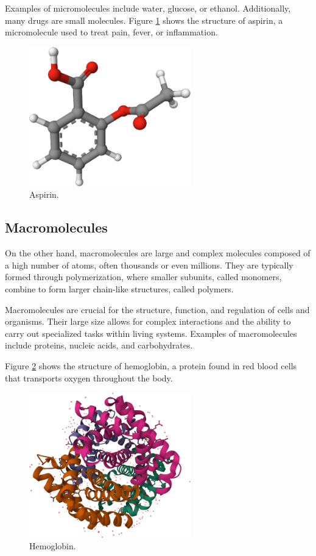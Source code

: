\documentclass[
  digital,     %
  oneside,     %
  nosansbold,  %
  nocolorbold, %
  lof,         %
  lot,         %
]{fithesis4}
\begin{document}
Examples of micromolecules include water, glucose, or ethanol. Additionally, many drugs are small molecules. Figure \ref{fig:aspirin} shows the structure of aspirin, a micromolecule used to treat pain, fever, or inflammation.

\begin{figure}[htbp]
  \begin{center}
    \includegraphics[width=7cm]{figures/aspirin.png}
  \end{center}
  \caption{Aspirin.}
  \label{fig:aspirin}
\end{figure}

\subsection{Macromolecules}


On the other hand, macromolecules are large and complex molecules composed of a high number of atoms, often thousands or even millions. They are typically formed through polymerization, where smaller subunits, called monomers, combine to form larger chain-like structures, called polymers.

Macromolecules are crucial for the structure, function, and regulation of cells and organisms. Their large size allows for complex interactions and the ability to carry out specialized tasks within living systems. Examples of macromolecules include proteins, nucleic acids, and carbohydrates.

Figure \ref{fig:hemoglobin} shows the structure of hemoglobin, a protein found in red blood cells that transports oxygen throughout the body.

\begin{figure}[htbp]
  \begin{center}
    \includegraphics[width=7cm]{figures/hemoglobin.png}
  \end{center}
  \caption{Hemoglobin.}
  \label{fig:hemoglobin}
\end{figure}
\end{document}
